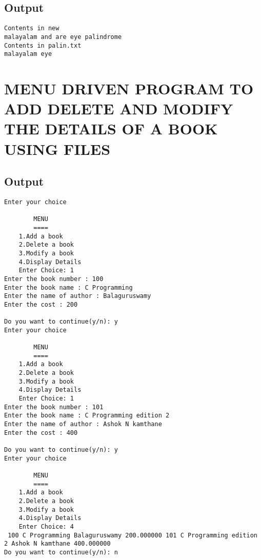 \documentclass[pdftex,12pt,a4paper]{report}
\begin{document}
\subsection*{Output}
\begin{lstlisting}
Contents in new
malayalam and are eye palindrome
Contents in palin.txt
malayalam eye
\end{lstlisting}


\newpage
\section*{MENU DRIVEN PROGRAM TO ADD DELETE AND MODIFY THE DETAILS OF A BOOK USING FILES }

\subsection*{Output}
\begin{lstlisting}
Enter your choice

		MENU
		====
	1.Add a book 
	2.Delete a book 
	3.Modify a book
	4.Display Details
	Enter Choice: 1
Enter the book number : 100
Enter the book name : C Programming
Enter the name of author : Balaguruswamy
Enter the cost : 200

Do you want to continue(y/n): y
Enter your choice

		MENU
		====
	1.Add a book 
	2.Delete a book 
	3.Modify a book
	4.Display Details
	Enter Choice: 1
Enter the book number : 101
Enter the book name : C Programming edition 2    
Enter the name of author : Ashok N kamthane
Enter the cost : 400

Do you want to continue(y/n): y
Enter your choice

		MENU
		====
	1.Add a book 
	2.Delete a book 
	3.Modify a book
	4.Display Details
	Enter Choice: 4
 100 C Programming Balaguruswamy 200.000000 101 C Programming edition 2 Ashok N kamthane 400.000000
Do you want to continue(y/n): n


\end{lstlisting}
\end{document}

